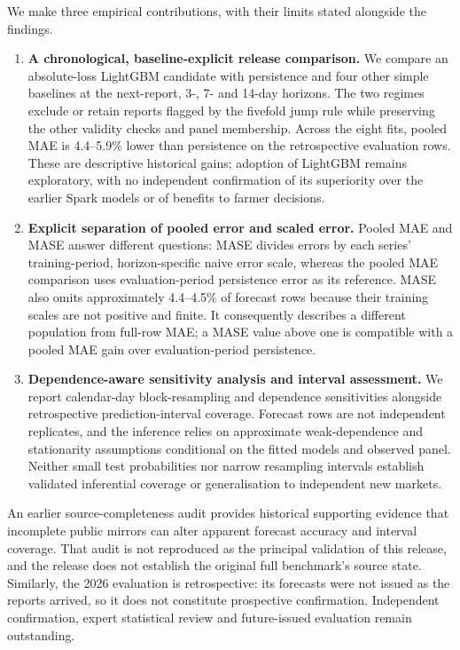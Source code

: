 We make three empirical contributions, with their limits stated alongside the findings.
\begin{enumerate}
  \item \textbf{A chronological, baseline-explicit release comparison.}
    We compare an absolute-loss LightGBM candidate with persistence and four other simple baselines at the next-report, 3-, 7- and 14-day horizons.
    The two regimes exclude or retain reports flagged by the fivefold jump rule while preserving the other validity checks and panel membership.
    Across the eight fits, pooled MAE is 4.4--5.9\% lower than persistence on the retrospective evaluation rows.
    These are descriptive historical gains; adoption of LightGBM remains exploratory, with no independent confirmation of its superiority over the earlier Spark models or of benefits to farmer decisions.
  \item \textbf{Explicit separation of pooled error and scaled error.}
    Pooled MAE and MASE answer different questions: MASE divides errors by each series' training-period, horizon-specific naive error scale, whereas the pooled MAE comparison uses evaluation-period persistence error as its reference.
    MASE also omits approximately 4.4--4.5\% of forecast rows because their training scales are not positive and finite.
    It consequently describes a different population from full-row MAE; a MASE value above one is compatible with a pooled MAE gain over evaluation-period persistence.
  \item \textbf{Dependence-aware sensitivity analysis and interval assessment.}
    We report calendar-day block-resampling and dependence sensitivities alongside retrospective prediction-interval coverage.
    Forecast rows are not independent replicates, and the inference relies on approximate weak-dependence and stationarity assumptions conditional on the fitted models and observed panel.
    Neither small test probabilities nor narrow resampling intervals establish validated inferential coverage or generalisation to independent new markets.
\end{enumerate}

An earlier source-completeness audit provides historical supporting evidence that incomplete public mirrors can alter apparent forecast accuracy and interval coverage.
That audit is not reproduced as the principal validation of this release, and the release does not establish the original full benchmark's source state.
Similarly, the 2026 evaluation is retrospective: its forecasts were not issued as the reports arrived, so it does not constitute prospective confirmation.
Independent confirmation, expert statistical review and future-issued evaluation remain outstanding.
